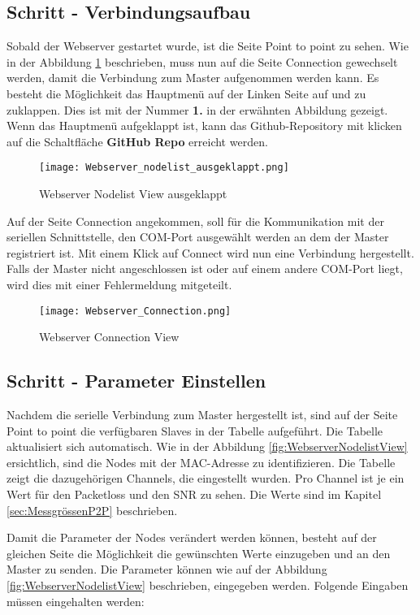 \subsection{Schritt - Verbindungsaufbau}\label{sec:SchrittVerbindungsaufbau}
Sobald der Webserver gestartet wurde, ist die Seite Point to point zu sehen. Wie in der Abbildung \ref{fig:WebserverNodelistViewausgeklappt} beschrieben, muss nun auf die Seite Connection gewechselt werden, damit die Verbindung zum Master aufgenommen werden kann. Es besteht die Möglichkeit das Hauptmenü auf der Linken Seite auf und zu zuklappen. Dies ist mit der Nummer \textbf{1.} in der erwähnten Abbildung gezeigt. Wenn das Hauptmenü aufgeklappt ist, kann das Github-Repository mit klicken auf die Schaltfläche \textbf{GitHub Repo} erreicht werden.
\begin{figure} [H]
	\centering
	\texttt{[image: Webserver\_nodelist\_ausgeklappt.png]}
	\caption{Webserver Nodelist View ausgeklappt}
	\label{fig:WebserverNodelistViewausgeklappt}
\end{figure}

Auf der Seite Connection angekommen, soll für die Kommunikation mit der seriellen Schnittstelle, den COM-Port ausgewählt werden an dem der Master registriert ist. Mit einem Klick auf Connect wird nun eine Verbindung hergestellt. Falls der Master nicht angeschlossen ist oder auf einem andere COM-Port liegt, wird dies mit einer Fehlermeldung mitgeteilt.
\begin{figure} [H]
	\centering
	\texttt{[image: Webserver\_Connection.png]}
	\caption{Webserver Connection View}
	\label{fig:WebserverConnectionView}
\end{figure}

\subsection{Schritt - Parameter Einstellen}\label{sec:SchrittParameterEinstellen}
Nachdem die serielle Verbindung zum Master hergestellt ist, sind auf der Seite Point to point die verfügbaren Slaves in der Tabelle aufgeführt. Die Tabelle aktualisiert sich automatisch. Wie in der Abbildung \ref{fig:WebserverNodelistView} ersichtlich, sind die Nodes mit der MAC-Adresse zu identifizieren. Die Tabelle zeigt die dazugehörigen Channels, die eingestellt wurden. Pro Channel ist je ein Wert für den Packetloss und den SNR zu sehen. Die Werte sind im Kapitel \ref{sec:MessgrössenP2P} beschrieben. 

Damit die Parameter der Nodes verändert werden können, besteht auf der gleichen Seite die Möglichkeit die gewünschten Werte einzugeben und an den Master zu senden. Die Parameter können wie auf der Abbildung \ref{fig:WebserverNodelistView} beschrieben, eingegeben werden. Folgende Eingaben müssen eingehalten werden:

